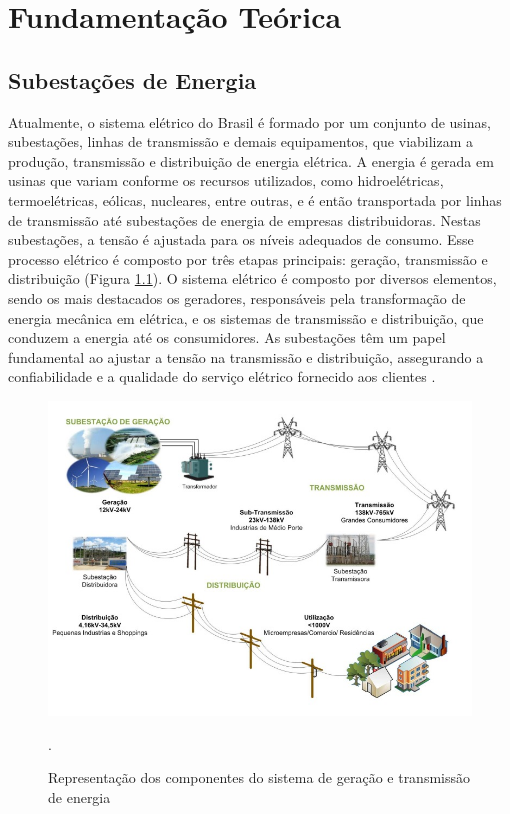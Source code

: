 \chapter{Fundamentação Teórica}

\section{Subestações de Energia}
\label{sec:subestacao}

Atualmente, o sistema elétrico do Brasil é formado por um conjunto de usinas, subestações, linhas de transmissão e demais equipamentos, que viabilizam a produção, transmissão e distribuição de energia elétrica. A energia é gerada em usinas que variam conforme os recursos utilizados, como hidroelétricas, termoelétricas, eólicas, nucleares, entre outras, e é então transportada por linhas de transmissão até subestações de energia de empresas distribuidoras. Nestas subestações, a tensão é ajustada para os níveis adequados de consumo. Esse processo elétrico é composto por três etapas principais: geração, transmissão e distribuição (Figura \ref{fig:substation}). O sistema elétrico é composto por diversos elementos, sendo os mais destacados os geradores, responsáveis pela transformação de energia mecânica em elétrica, e os sistemas de transmissão e distribuição, que conduzem a energia até os consumidores. As subestações têm um papel fundamental ao ajustar a tensão na transmissão e distribuição, assegurando a confiabilidade e a qualidade do serviço elétrico fornecido aos clientes  \cite{lopes2012smart}.

\begin{figure}[!h]
    \centering
    \begin{minipage}{0.9\linewidth}
    \centering
    \captionsetup{justification=centering,margin=0.5cm,font=small}
    \includegraphics[width=0.7\linewidth]{img/cap2/substation.jpeg}
    \caption{Representação dos componentes do sistema de geração e transmissão de energia \cite{lopes2012smart}}.
    \label{fig:substation}
    \end{minipage}
\end{figure}

